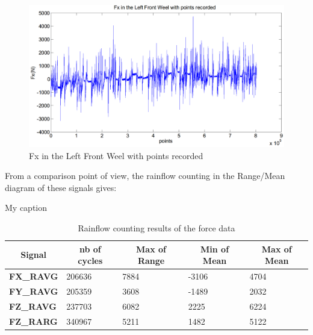 \documentclass[3p,times,procedia,number]{elsarticle}
\begin{document}
\begin{figure}[h!]
	\centering
	\includegraphics[width=\textwidth]{figures//fx.png} 
	\caption{Fx in the Left Front Weel with points recorded}
	\label{fx}
\end{figure}

From a comparison point of view, the rainflow counting in the Range/Mean diagram of these signals gives:

\begin{table}[]
	\centering
	\caption{My caption}
	\label{rain}
	\begin{tabular}{lllll}
		\hline
		\multicolumn{1}{c}{\textbf{Signal}} & \multicolumn{1}{c}{\textbf{nb of cycles}} & \multicolumn{1}{c}{\textbf{Max of Range}} & \multicolumn{1}{c}{\textbf{Min of Mean}} & \multicolumn{1}{c}{\textbf{Max of Mean}} \\ \hline
		\textbf{FX\_RAVG}                   & 206636                                    & 7884                                      & -3106                                    & 4704                                     \\
		\textbf{FY\_RAVG}                   & 205359                                    & 3608                                      & -1489                                    & 2032                                     \\
		\textbf{FZ\_RAVG}                   &237703             & 6082                                      & 2225                                     & 6224                                     \\
		\textbf{FZ\_RARG}                   & 340967                                    & 5211                                      & 1482                                     & 5122                                     \\ \hline
	\end{tabular}
	\caption{Rainflow counting results of the force data}
	\label{rf}
\end{table}
\end{document}

